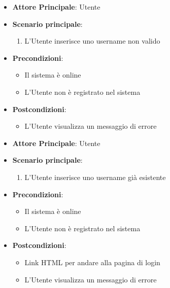 \begin{itemize}
    \item \textbf{Attore Principale}: Utente
    \item \textbf{Scenario principale}:
    \begin{enumerate}
        \item L'Utente inserisce uno username non valido
    \end{enumerate}
    \item \textbf{Precondizioni}:
    \begin{itemize}
        \item Il sistema è online
        \item L'Utente non è registrato nel sistema
    \end{itemize}
    \item \textbf{Postcondizioni}:
    \begin{itemize}
        \item L'Utente visualizza un messaggio di errore
    \end{itemize}
\end{itemize}

\label{uc_01.1.2}

\begin{itemize}
    \item \textbf{Attore Principale}: Utente
    \item \textbf{Scenario principale}:
    \begin{enumerate}
        \item L'Utente inserisce uno username già esistente
    \end{enumerate}
    \item \textbf{Precondizioni}:
    \begin{itemize}
        \item Il sistema è online
        \item L'Utente non è registrato nel sistema
    \end{itemize}
    \item \textbf{Postcondizioni}:
    \begin{itemize}
        \item Link HTML per andare alla pagina di login
        \item L'Utente visualizza un messaggio di errore
    \end{itemize}
\end{itemize}

\label{uc_01.2}

